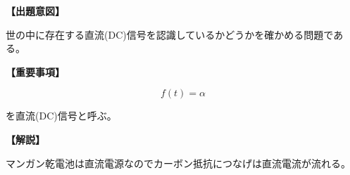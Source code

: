 \noindent \textbf{【出題意図】}

\noindent 世の中に存在する直流(DC)信号を認識しているかどうかを確かめる問題である。

\vspace{1em}
\noindent \textbf{【重要事項】}

\[
f(t) = \alpha
\]

\medskip
\noindent を直流(DC)信号と呼ぶ。


\vspace{1em}
\noindent \textbf{【解説】}

\noindent マンガン乾電池は直流電源なのでカーボン抵抗につなげは直流電流が流れる。

